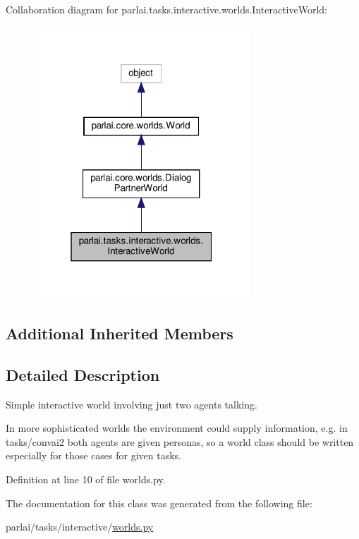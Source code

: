 Collaboration diagram for parlai.\+tasks.\+interactive.\+worlds.\+Interactive\+World\+:\nopagebreak
\begin{figure}[H]
\begin{center}
\leavevmode
\includegraphics[width=229pt]{d4/d40/classparlai_1_1tasks_1_1interactive_1_1worlds_1_1InteractiveWorld__coll__graph}
\end{center}
\end{figure}
\subsection*{Additional Inherited Members}


\subsection{Detailed Description}
\begin{DoxyVerb}Simple interactive world involving just two agents talking.

In more sophisticated worlds the environment could supply information, e.g. in
tasks/convai2 both agents are given personas, so a world class should be written
especially for those cases for given tasks.
\end{DoxyVerb}
 

Definition at line 10 of file worlds.\+py.



The documentation for this class was generated from the following file\+:\begin{DoxyCompactItemize}
\item 
parlai/tasks/interactive/\hyperlink{parlai_2tasks_2interactive_2worlds_8py}{worlds.\+py}\end{DoxyCompactItemize}
